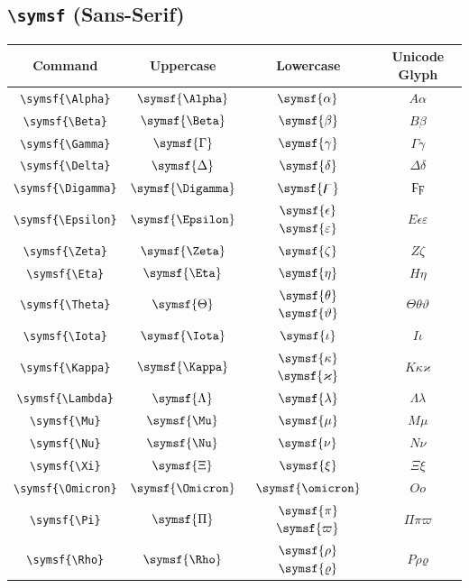 \documentclass[12pt,a4paper]{article}
\begin{document}
\newpage

\subsection*{\texttt{\textbackslash{}symsf} (Sans-Serif)}

\begin{longtable}{|c|c|c|c|}
\hline
\textbf{Command} & \textbf{Uppercase} & \textbf{Lowercase} & \textbf{Unicode Glyph} \\
\hline
\verb|\symsf{\Alpha}| & $\symsf{\Alpha}$ & $\symsf{\alpha}$ & $ Α 𝛼 $ \\
\verb|\symsf{\Beta}| & $\symsf{\Beta}$ & $\symsf{\beta}$ & $ Β 𝛽 $ \\
\verb|\symsf{\Gamma}| & $\symsf{\Gamma}$ & $\symsf{\gamma}$ & $ Γ 𝛾 $ \\
\verb|\symsf{\Delta}| & $\symsf{\Delta}$ & $\symsf{\delta}$ & $ Δ 𝛿 $ \\
\verb|\symsf{\Digamma}| & $\symsf{\Digamma}$ & $\symsf{\digamma}$ & $ Ϝ ϝ $ \\
\verb|\symsf{\Epsilon}| & $\symsf{\Epsilon}$ & $\symsf{\epsilon}$ $\symsf{\varepsilon}$ & $ Ε 𝜖 𝜀 $ \\
\verb|\symsf{\Zeta}| & $\symsf{\Zeta}$ & $\symsf{\zeta}$ & $ Ζ 𝜁 $ \\
\verb|\symsf{\Eta}| & $\symsf{\Eta}$ & $\symsf{\eta}$ & $ Η 𝜂 $ \\
\verb|\symsf{\Theta}| & $\symsf{\Theta}$ & $\symsf{\theta}$ $\symsf{\vartheta}$ & $ Θ 𝜃 𝜗 $ \\
\verb|\symsf{\Iota}| & $\symsf{\Iota}$ & $\symsf{\iota}$ & $ Ι 𝜄 $ \\
\verb|\symsf{\Kappa}| & $\symsf{\Kappa}$ & $\symsf{\kappa}$ $\symsf{\varkappa}$ & $ Κ 𝜅 𝜘 $ \\
\verb|\symsf{\Lambda}| & $\symsf{\Lambda}$ & $\symsf{\lambda}$ & $ Λ 𝜆 $ \\
\verb|\symsf{\Mu}| & $\symsf{\Mu}$ & $\symsf{\mu}$ & $ Μ 𝜇 $ \\
\verb|\symsf{\Nu}| & $\symsf{\Nu}$ & $\symsf{\nu}$ & $ Ν 𝜈 $ \\
\verb|\symsf{\Xi}| & $\symsf{\Xi}$ & $\symsf{\xi}$ & $ Ξ 𝜉 $ \\
\verb|\symsf{\Omicron}| & $\symsf{\Omicron}$ & $\symsf{\omicron}$ & $ Ο 𝜊 $ \\
\verb|\symsf{\Pi}| & $\symsf{\Pi}$ & $\symsf{\pi}$ $\symsf{\varpi}$ & $ Π 𝜋 𝜛 $ \\
\verb|\symsf{\Rho}| & $\symsf{\Rho}$ & $\symsf{\rho}$ $\symsf{\varrho}$ & $ Ρ 𝜌 𝜚 $ \\

\end{longtable}
\end{document}
